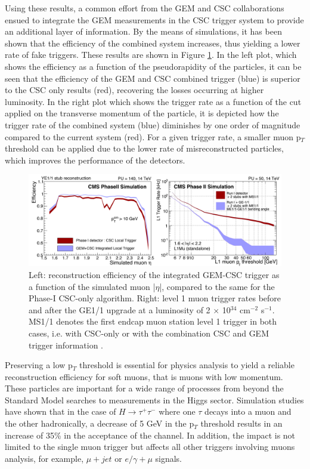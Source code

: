     Using these results, a common effort from the GEM and CSC collaborations ensued to integrate the GEM measurements in the CSC trigger system to provide an additional layer of information. By the means of simulations, it has been shown that the efficiency of the combined system increases, thus yielding a lower rate of fake triggers. These results are shown in Figure \ref{fig:II-1-trigger}. In the left plot, which shows the efficiency as a function of the pseudorapidity of the particles, it can be seen that the efficiency of the GEM and CSC combined trigger (blue) is superior to the CSC only results (red), recovering the losses occurring at higher luminosity. In the right plot which shows the trigger rate as a function of the cut applied on the transverse momentum of the particle, it is depicted how the trigger rate of the combined system (blue) diminishes by one order of magnitude compared to the current system (red). For a given trigger rate, a smaller muon p$_T$ threshold can be applied due to the lower rate of misreconstructed particles, which improves the performance of the detectors. \\

    \begin{figure}[t!]
      \centering
      \includegraphics[width=\textwidth]{img/II-1-gem/gem-csc-efficiency.pdf}
      \caption{Left: reconstruction efficiency of the integrated GEM-CSC trigger as a function of the simulated muon |$\eta$|, compared to the same for the Phase-I CSC-only algorithm. Right: level 1 muon trigger rates before and after the GE1/1 upgrade at a luminosity of 2 $\times$ 10$^{34}$ cm$^{-2}$ s$^{-1}$. MS1/1 denotes the first endcap muon station level 1 trigger in both cases, i.e. with CSC-only or with the combination CSC and GEM trigger information \cite{Colaleo:2021453}.}
      \label{fig:II-1-trigger}
    \end{figure}

    Preserving a low p$_T$ threshold is essential for physics analysis to yield a reliable reconstruction efficiency for soft muons, that is muons with low momentum. These particles are important for a wide range of processes from beyond the Standard Model searches to measurements in the Higgs sector. Simulation studies have shown that in the case of $ H \rightarrow \tau^+ \tau^- $ where one $ \tau $ decays into a muon and the other hadronically, a decrease of 5 GeV in the p$_T$ threshold results in an increase of 35\% in the acceptance of the channel. In addition, the impact is not limited to the single muon trigger but affects all other triggers involving muons analysis, for example, $\mu+jet$ or $e/\gamma+\mu$ signals. \\

